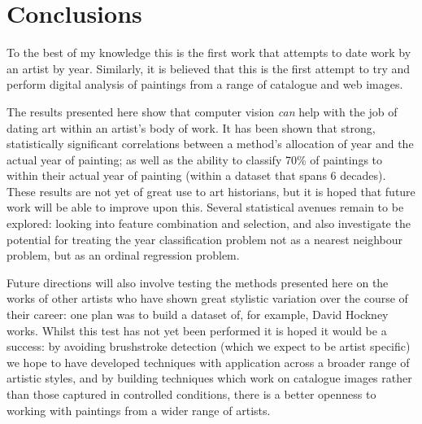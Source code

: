 \chapter{Conclusions}
To the best of my knowledge this is the first work that attempts to date work by an artist by 
year. Similarly, it is believed that this is the first attempt to try and perform digital analysis
of paintings from a range of catalogue and web images.

The results presented here show that computer vision \emph{can} help with the job of dating art 
within an artist's body of work. It has been shown that strong, statistically significant 
correlations between a method's allocation of year and the actual year of painting; as well as the
ability to classify 70\% of paintings to within their actual year of painting (within a dataset 
that spans 6 decades). These results are not yet of great use to art historians, but it is hoped 
that future work will be able to improve upon this. Several statistical avenues remain to be 
explored: looking into feature combination and selection, and also investigate the potential for 
treating the year classification problem not as a nearest neighbour problem, but as an ordinal 
regression problem. 

Future directions will also involve testing the methods presented here on the works of other 
artists who have shown great stylistic variation over the course of their career: one plan was to 
build a dataset of, for example, David Hockney works.  Whilst this test has not yet been performed
it is hoped it would be a success: by avoiding brushstroke detection (which we expect to be artist
specific) we hope to have developed techniques with application across a broader range of artistic
styles, and by building techniques which work on catalogue images rather than those captured in 
controlled conditions, there is a better openness to working with paintings from a wider range of 
artists.
